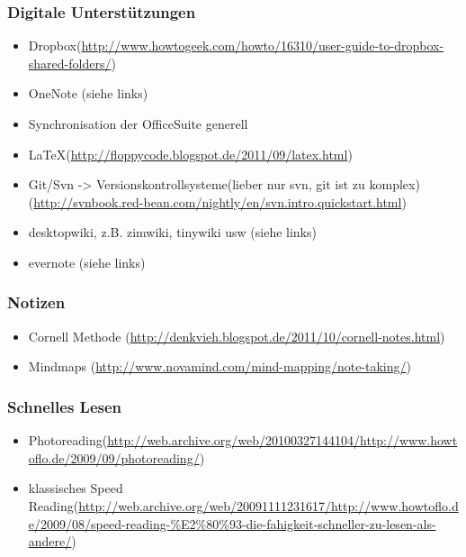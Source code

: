 \documentclass[11pt]{article}
\begin{document}
\subsubsection{Digitale Unterstützungen}
\label{sec-2-3-2}

\begin{itemize}
\item Dropbox(\href{http://www.howtogeek.com/howto/16310/user-guide-to-dropbox-shared-folders/}{http://www.howtogeek.com/howto/16310/user-guide-to-dropbox-shared-folders/})
\item OneNote (siehe links)
\item Synchronisation der OfficeSuite generell
\item \LaTeX{}(\href{http://floppycode.blogspot.de/2011/09/latex.html}{http://floppycode.blogspot.de/2011/09/latex.html})
\item Git/Svn -> Versionskontrollsysteme(lieber nur svn, git ist zu komplex)
  (\href{http://svnbook.red-bean.com/nightly/en/svn.intro.quickstart.html}{http://svnbook.red-bean.com/nightly/en/svn.intro.quickstart.html})
\item desktopwiki, z.B. zimwiki, tinywiki usw (siehe links)
\item evernote (siehe links)
\end{itemize}
\subsubsection{Notizen}
\label{sec-2-3-3}

\begin{itemize}
\item Cornell Methode (\href{http://denkvieh.blogspot.de/2011/10/cornell-notes.html}{http://denkvieh.blogspot.de/2011/10/cornell-notes.html})
\item Mindmaps (\href{http://www.novamind.com/mind-mapping/note-taking/}{http://www.novamind.com/mind-mapping/note-taking/})
\end{itemize}
\subsubsection{Schnelles Lesen}
\label{sec-2-3-4}

\begin{itemize}
\item Photoreading(\href{http://web.archive.org/web/20100327144104/http://www.howtoflo.de/2009/09/photoreading/}{http://web.archive.org/web/20100327144104/http://www.howtoflo.de/2009/09/photoreading/})
\item klassisches Speed Reading(\href{http://web.archive.org/web/20091111231617/http://www.howtoflo.de/2009/08/speed-reading-%E2%80%93-die-fahigkeit-schneller-zu-lesen-als-andere/}{http://web.archive.org/web/20091111231617/http://www.howtoflo.de/2009/08/speed-reading-\%E2\%80\%93-die-fahigkeit-schneller-zu-lesen-als-andere/})
\end{itemize}
\end{document}
